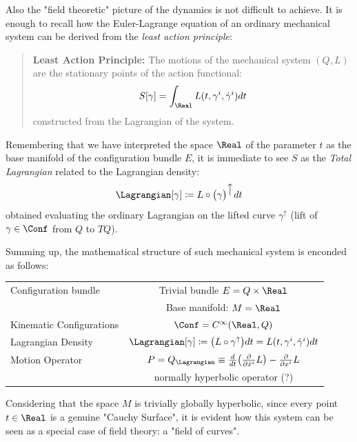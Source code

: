 \documentclass[Main]{subfiles}
\begin{document}
			Also the "field theoretic" picture of the dynamics is not difficult to achieve.
			It is enough to recall how the Euler-Lagrange equation of an ordinary mechanical system can be derived from the \emph{least action principle}:
			\begin{quotation}
				\textbf{Least Action Principle:}
				The %
				 motions of the mechanical system $(Q,L)$ are the stationary points of the action functional:
				\begin{displaymath}
					S [\gamma]= \int_\Real L(t,\gamma^i, \dot{\gamma}^i) dt
				\end{displaymath}
				constructed from the Lagrangian of the system.
			\end{quotation}
			Remembering that we have interpreted the space $\Real$ of the parameter $t$ as the base manifold of the configuration bundle $E$, it is immediate to see $S$ as the \emph{Total Lagrangian} related to the Lagrangian density:
			\begin{displaymath}
				\Lagrangian[\gamma] \coloneqq L \circ \big( \gamma \big)^{\big\uparrow} dt
			\end{displaymath}
			obtained evaluating the ordinary Lagrangian on the lifted curve $\gamma^\uparrow$ (lift of $\gamma\in \Conf$ from $Q$ to $TQ$).
		
		Summing up, the mathematical structure of such mechanical system is enconded as follows:
			\begin{center}\begin{tabular}{|l|c|}
			\hline
			Configuration bundle & Trivial bundle  $E= Q \times \Real$\\
													& Base manifold: $M=\Real$\\
			\hline
			Kinematic Configurations &  $\Conf=C^\infty(\Real,Q)$\\
			\hline
			Lagrangian Density		&	$\Lagrangian  [\gamma] \coloneqq \big( L \circ	\gamma^\uparrow \big) dt  = L(t,\gamma^i,\dot{\gamma}^i) dt$\\
			\hline
			Motion Operator			&  $P=Q_\Lagrangian \equiv \frac{d}{dt}\big(\frac{\partial}{\partial \dot{x}^i}L\big)-\frac{\partial}{\partial x^i}L $\\
													& normally hyperbolic operator (\danger ?)\\
			\hline
			\end{tabular}\end{center}
			
			Considering that the space $M$ is trivially globally hyperbolic, since every point $t\in\Real$ is a genuine "Cauchy Surface", it is evident how this system can be seen as a special case of field theory: a "field of curves".
\end{document}
